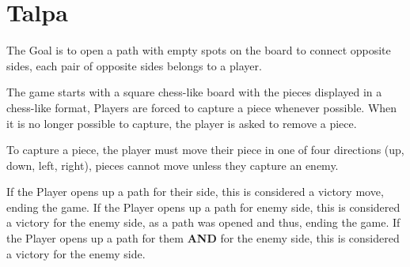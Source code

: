 \section{Talpa}
\noindent The Goal is to open a path with empty spots on the board to connect opposite sides,
each pair of opposite sides belongs to a player.

\noindent The game starts with a square chess-like board with the pieces displayed in a chess-like format,
Players are forced to capture a piece whenever possible.
When it is no longer possible to capture, the player is asked to remove a piece.

\noindent To capture a piece, the player must move their piece in one of four directions (up, down, left, right),
pieces cannot move unless they capture an enemy.

\noindent If the Player opens up a path for their side, this is considered a victory move, ending the game.
If the Player opens up a path for enemy side, this is considered a victory for the enemy side, as a path
was opened and thus, ending the game.
If the Player opens up a path for them \textbf{AND} for the enemy side, this is considered a victory for the enemy side.